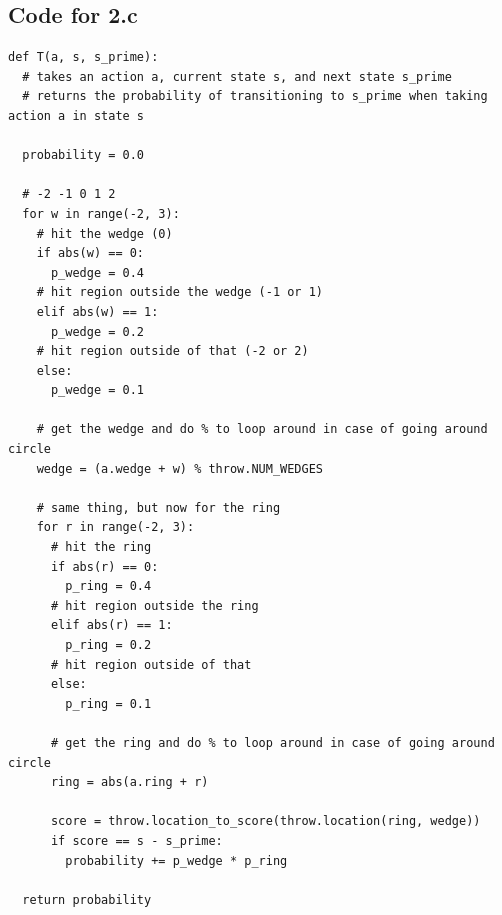 \documentclass{article}
\begin{document}
\subsection*{Code for 2.c}
\begin{verbatim}
def T(a, s, s_prime):
  # takes an action a, current state s, and next state s_prime
  # returns the probability of transitioning to s_prime when taking action a in state s
  
  probability = 0.0

  # -2 -1 0 1 2
  for w in range(-2, 3):
    # hit the wedge (0)
    if abs(w) == 0:
      p_wedge = 0.4
    # hit region outside the wedge (-1 or 1)
    elif abs(w) == 1:
      p_wedge = 0.2
    # hit region outside of that (-2 or 2)
    else:
      p_wedge = 0.1

    # get the wedge and do % to loop around in case of going around circle
    wedge = (a.wedge + w) % throw.NUM_WEDGES

    # same thing, but now for the ring
    for r in range(-2, 3):
      # hit the ring
      if abs(r) == 0:
        p_ring = 0.4
      # hit region outside the ring
      elif abs(r) == 1:
        p_ring = 0.2
      # hit region outside of that
      else:
        p_ring = 0.1

      # get the ring and do % to loop around in case of going around circle
      ring = abs(a.ring + r)

      score = throw.location_to_score(throw.location(ring, wedge))
      if score == s - s_prime:
        probability += p_wedge * p_ring

  return probability
\end{verbatim}
\end{document}
